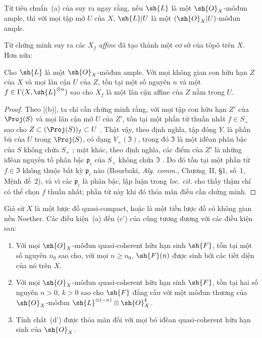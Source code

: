 \documentclass[oneside,10pt]{amsart}
\renewcommand{\geq}{\geqslant}
\newcommand{\oldpage}[2][]{\marginnote{\normalfont\footnotesize\textbf{#1}~|~#2}\ignorespaces}
\let\EGAOriginalLabel\label
\renewcommand{\label}[1]{\phantomsection\EGAOriginalLabel{#1}}
\begin{document}
Từ tiêu chuẩn~(a) của  suy ra ngay rằng, nếu $\sh{L}$ là một $\sh{O}_X$-môđun ample, thì với mọi tập mở $U$ của $X$, $\sh{L}|U$ là một $(\sh{O}_X|U)$-môđun ample.

Từ chứng minh  suy ra các $X_f$ \emph{affine} đã tạo thành một cơ sở của tôpô trên $X$.
Hơn nữa:

\begin{corollary}[4.5.4]
\label{II.4.5.4}
Cho $\sh{L}$ là một $\sh{O}_X$-môđun ample.
Với mọi không gian con hữu hạn $Z$ của $X$ và mọi lân cận $U$ của $Z$, tồn tại một số nguyên $n$ và một $f\in\Gamma(X,\sh{L}^{\otimes n})$ sao cho $X_f$ là một lân cận affine của $Z$ nằm trong $U$.
\end{corollary}

\begin{proof}
\oldpage[II]{85}
Theo [(b)], ta chỉ cần chứng minh rằng, với mọi tập con hữu hạn $Z'$ của $\Proj(S)$ và mọi lân cận mở $U$ của $Z'$, tồn tại một phần tử thuần nhất $f\in S_+$ sao cho $Z\subset(\Proj(S))_f\subset U$ .
Thật vậy, theo định nghĩa, tập đóng $Y$, là phần bù của $U$ trong $\Proj(S)$, có dạng $V_+(\mathfrak{I})$, trong đó $\mathfrak{I}$ là một iđêan phân bậc của $S$ không chứa $S_+$ ;
mặt khác, theo định nghĩa, các điểm của $Z'$ là những iđêan nguyên tố phân bậc $\mathfrak{p}_i$ của $S_+$ không chứa $\mathfrak{I}$ .
Do đó tồn tại một phần tử $f\in\mathfrak{I}$ không thuộc bất kỳ $\mathfrak{p}_i$ nào (Bourbaki, \emph{Alg. comm.}, Chương~II, \S1, số~1, Mệnh đề~2), và vì các $\mathfrak{p}_i$ là phân bậc, lập luận trong \emph{loc. cit.} cho thấy thậm chí có thể chọn $f$ thuần nhất;
phần tử này khi đó thỏa mãn điều cần chứng minh.
\end{proof}

\begin{proposition}[4.5.5]
\label{II.4.5.5}
Giả sử $X$ là một lược đồ quasi-compact, hoặc là một tiền lược đồ có không gian nền Noether.
Các điều kiện~(a) đến (c') của  cũng tương đương với các điều kiện sau:
\begin{enumerate}
  \item[\rm{(d)}] Với mọi $\sh{O}_X$-môđun quasi-coherent hữu hạn sinh $\sh{F}$, tồn tại một số nguyên $n_0$ sao cho, với mọi $n\geq n_0$, $\sh{F}(n)$ được sinh bởi các tiết diện của nó trên $X$.
  \item[\rm{(d')}] Với mọi $\sh{O}_X$-môđun quasi-coherent hữu hạn sinh $\sh{F}$, tồn tại hai số nguyên $n>0$, $k>0$ sao cho $\sh{F}$ đẳng cấu với một môđun thương của $\sh{O}_X$-môđun $\sh{L}^{\otimes(-n)}\otimes\sh{O}_X^k$.
  \item[\rm{(d'')}] Tính chất~(d') được thỏa mãn đối với mọi bó iđêan quasi-coherent hữu hạn sinh của $\sh{O}_X$.
\end{enumerate}
\end{proposition}
\end{document}
